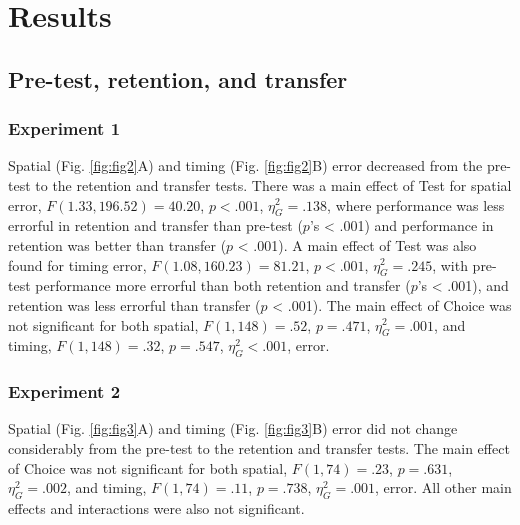 \documentclass[
  man, donotrepeattitle,floatsintext]{apa7}
\begin{document}
\hypertarget{results}{%
\section{Results}\label{results}}

\hypertarget{pre-test-retention-and-transfer}{%
\subsection{Pre-test, retention, and transfer}\label{pre-test-retention-and-transfer}}

\hypertarget{experiment-1-2}{%
\subsubsection{Experiment 1}\label{experiment-1-2}}

Spatial (Fig. \ref{fig:fig2}A) and timing (Fig. \ref{fig:fig2}B) error decreased from the pre-test to the retention and transfer tests. There was a main effect of Test for spatial error, \(F(1.33,196.52) = 40.20\), \(p < .001\), \(\eta_{G}^2 = .138\), where performance was less errorful in retention and transfer than pre-test (\(p\)'s \textless{} .001) and performance in retention was better than transfer (\(p\) \textless{} .001). A main effect of Test was also found for timing error, \(F(1.08,160.23) = 81.21\), \(p < .001\), \(\eta_{G}^2 = .245\), with pre-test performance more errorful than both retention and transfer (\(p\)'s \textless{} .001), and retention was less errorful than transfer (\(p\) \textless{} .001). The main effect of Choice was not significant for both spatial, \(F(1,148) = .52\), \(p = .471\), \(\eta_{G}^2 = .001\), and timing, \(F(1,148) = .32\), \(p = .547\), \(\eta_{G}^2 < .001\), error.

\hypertarget{experiment-2-2}{%
\subsubsection{Experiment 2}\label{experiment-2-2}}

Spatial (Fig. \ref{fig:fig3}A) and timing (Fig. \ref{fig:fig3}B) error did not change considerably from the pre-test to the retention and transfer tests. The main effect of Choice was not significant for both spatial, \(F(1,74) = .23\), \(p = .631\), \(\eta_{G}^2 = .002\), and timing, \(F(1,74) = .11\), \(p = .738\), \(\eta_{G}^2 = .001\), error. All other main effects and interactions were also not significant.

\clearpage
\end{document}
